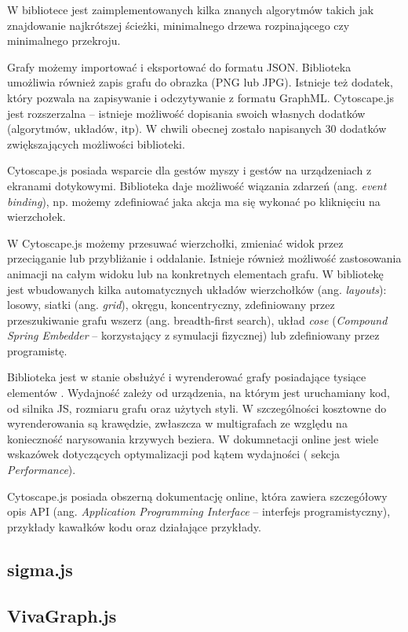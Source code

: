W bibliotece jest zaimplementowanych kilka znanych algorytmów takich jak znajdowanie najkrótszej ścieżki, minimalnego drzewa rozpinającego czy minimalnego przekroju. 

Grafy możemy importować i eksportować do formatu JSON. Biblioteka umożliwia również zapis grafu do obrazka (PNG lub JPG). Istnieje też dodatek, który pozwala na zapisywanie i odczytywanie z formatu GraphML. Cytoscape.js jest rozszerzalna -- istnieje możliwość dopisania swoich własnych dodatków (algorytmów, układów, itp).  W chwili obecnej zostało napisanych 30 dodatków zwiększających możliwości biblioteki. 

Cytoscape.js posiada wsparcie dla gestów myszy i gestów na urządzeniach z ekranami dotykowymi. Biblioteka daje możliwość wiązania zdarzeń (ang. \textit{event binding}), np. możemy zdefiniować jaka akcja ma się wykonać po kliknięciu na wierzchołek. 

W Cytoscape.js możemy przesuwać wierzchołki, zmieniać widok przez przeciąganie lub przybliżanie i oddalanie. Istnieje również możliwość zastosowania animacji na całym widoku lub na konkretnych elementach grafu. W bibliotekę jest wbudowanych kilka automatycznych układów wierzchołków (ang. \textit{layouts}): losowy, siatki (ang. \textit{grid}), okręgu, koncentryczny, zdefiniowany przez przeszukiwanie grafu wszerz (ang. breadth-first search), układ \textit{cose} (\textit{Compound Spring Embedder} -- korzystający z symulacji fizycznej) lub zdefiniowany przez programistę. 

Biblioteka jest w stanie obsłużyć i wyrenderować grafy posiadające tysiące elementów \cite[310]{franz}. Wydajność zależy od urządzenia, na którym jest uruchamiany kod, od silnika JS, rozmiaru grafu oraz użytych styli. W szczególności kosztowne do wyrenderowania są krawędzie, zwłaszcza w multigrafach ze względu na konieczność narysowania krzywych beziera. W dokumnetacji online jest wiele wskazówek dotyczących optymalizacji pod kątem wydajności (\cite{cytoscape} sekcja \textit{Performance}).

Cytoscape.js posiada obszerną dokumentację online, która zawiera szczegółowy opis API (ang. \textit{Application Programming Interface} -- interfejs programistyczny), przykłady kawałków kodu oraz działające przykłady. 

\subsection{sigma.js}


\subsection{VivaGraph.js}

